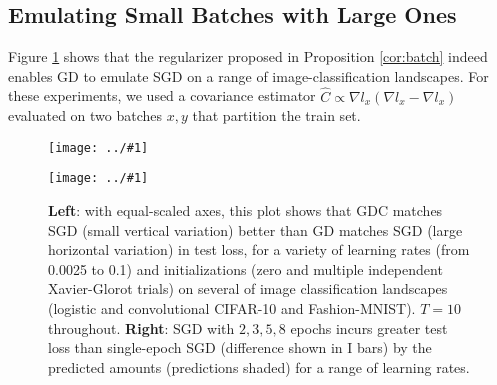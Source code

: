 \documentclass{article}
\newcommand{\plotmoo}[3]{
    \texttt{[image: ../\#1]}
}
\begin{document}
    \subsection{Emulating Small Batches with Large Ones}
        Figure \ref{fig:bmmulti} shows that the regularizer proposed in
        Proposition \ref{cor:batch} indeed enables GD to emulate SGD
        on a range of image-classification landscapes.  For these experiments,
        we used a covariance
        estimator $\hat C \propto \nabla l_x (\nabla l_x - \nabla l_x)$ evaluated on
        two batches $x, y$ that partition the train set.
        \begin{figure}[h!] 
            \centering
            \plotmoo{plots/big-bm-new}{0.48\columnwidth}{4.0cm}
            \plotmoo{plots/multi-fashion-logistic-0}{0.48\columnwidth}{4.0cm}
            \caption{
                {\bf Left}: with equal-scaled axes, this plot shows that GDC
                matches SGD (small vertical variation) better than GD matches
                SGD (large horizontal variation) in test loss, for a variety of
                learning rates (from 0.0025 to 0.1) and initializations (zero
                and multiple independent Xavier-Glorot trials) on several of
                image classification landscapes (logistic and convolutional
                CIFAR-10 and Fashion-MNIST).  $T=10$ throughout.
                {\bf Right}: SGD with $2, 3, 5, 8$ epochs incurs greater test
                loss than single-epoch SGD (difference shown in I bars) by the
                predicted amounts (predictions shaded) for a range of learning
                rates.
            }
            \label{fig:bmmulti}
        \end{figure}
  
\end{document}
